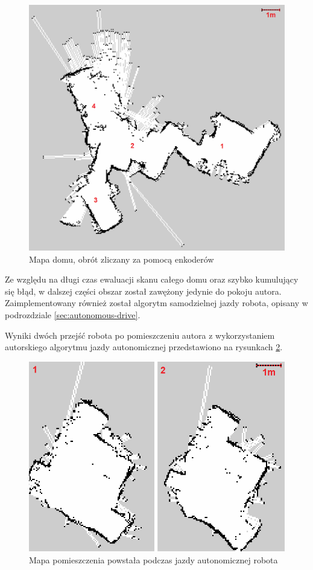 \begin{figure}[H]
	\centering
		\includegraphics[width=0.8\linewidth]{rys/saved-map-2-encoder-only-cropped-upscaled-path-withscale.png}
	\caption{Mapa domu, obrót zliczany za pomocą enkoderów}
	\label{fig:encoder-only-run-first}
\end{figure}

Ze względu na długi czas ewaluacji skanu całego domu oraz szybko kumulujący się błąd, w dalszej części obszar został zawężony jedynie do pokoju autora. Zaimplementowany również został algorytm samodzielnej jazdy robota, opisany w podrozdziale \ref{sec:autonomous-drive}.

Wyniki dwóch przejść robota po pomieszczeniu autora z wykorzystaniem autorskiego algorytmu jazdy autonomicznej przedstawiono na rysunkach \ref{fig:final-scans}.


\begin{figure}[H]
	\centering
		\includegraphics[width=0.8\linewidth]{rys/saved-map-final-1and2-cropped-upscaled-withscale.png}
	\caption{Mapa pomieszczenia powstała podczas jazdy autonomicznej robota}
    \label{fig:final-scans}
\end{figure}